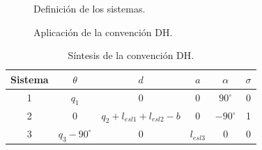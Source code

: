 \documentclass[a4paper,12pt]{article}
\begin{document}
\begin{figure}[H]
    \centering
    \begin{adjustbox}{scale = 0.5, max width=\columnwidth}
    \end{adjustbox}
    \caption{Definición de los sistemas.}
\end{figure}

\begin{figure}[H]
    \centering
    \begin{adjustbox}{scale = 0.85, max width=\columnwidth}
    \end{adjustbox}
    \caption{Aplicación de la convención DH.}
\end{figure}

\begin{table}[H]
    \centering
    \begin{tabular}{|c|c|c|c|c|c|}
    \hline
    Sistema & $\theta$          & $d$                               & $a$         & $\alpha$     & $\sigma$ \\ \hline
    1       & $q_1$             & 0                                 & $0$         & $90^\circ$   & 0        \\ \hline
    2       & $0$               & $q_2 + l_{esl1} + l_{esl2} - b$   & $0$         & $-90^\circ$  & 1        \\ \hline
    3       & $q_3 - 90^\circ$  & 0                                 & $l_{esl3}$  & 0            & 0        \\ \hline
    \end{tabular}
    \caption{Síntesis de la convención DH.}
\end{table}
\end{document}
